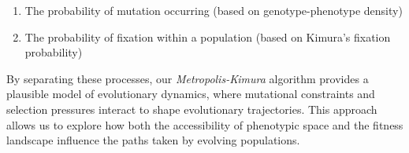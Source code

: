 \documentclass[
]{scrartcl}
\providecommand{\tightlist}{%
  \setlength{\itemsep}{0pt}\setlength{\parskip}{0pt}}\usepackage{longtable,booktabs,array}
\begin{document}
\begin{enumerate}
\def\labelenumi{\arabic{enumi}.}
\tightlist
\item
  The probability of mutation occurring (based on genotype-phenotype
  density)
\item
  The probability of fixation within a population (based on Kimura's
  fixation probability)
\end{enumerate}

By separating these processes, our \emph{Metropolis-Kimura} algorithm
provides a plausible model of evolutionary dynamics, where mutational
constraints and selection pressures interact to shape evolutionary
trajectories. This approach allows us to explore how both the
accessibility of phenotypic space and the fitness landscape influence
the paths taken by evolving populations.
\end{document}
